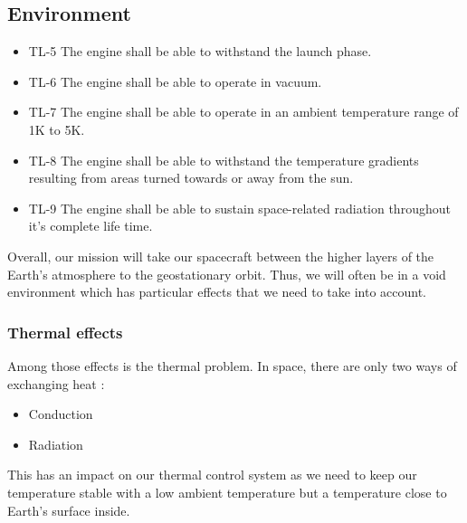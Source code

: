 \subsection{Environment}
\begin{itemize}
    \item TL-5 The engine shall be able to withstand the launch phase.

    \item TL-6 The engine shall be able to operate in vacuum.

    \item TL-7 The engine shall be able to operate in an ambient temperature range of 1K to 5K.

    \item TL-8 The engine shall be able to withstand the temperature gradients resulting from areas turned towards or away from the sun.

    \item TL-9 The engine shall be able to sustain space-related radiation throughout it's complete life time.
\end{itemize}


Overall, our mission will take our spacecraft between the higher layers of the Earth's atmosphere to the geostationary orbit. Thus, we will often be in a void environment which has particular effects that we need to take into account.
\subsubsection{Thermal effects}
Among those effects is the thermal problem. In space, there are only two ways of exchanging heat :
\begin{itemize}
	\item Conduction
	\item Radiation 
\end{itemize}
This has an impact on our thermal control system as we need to keep our temperature stable with a low ambient temperature but a temperature close to Earth's surface inside.
